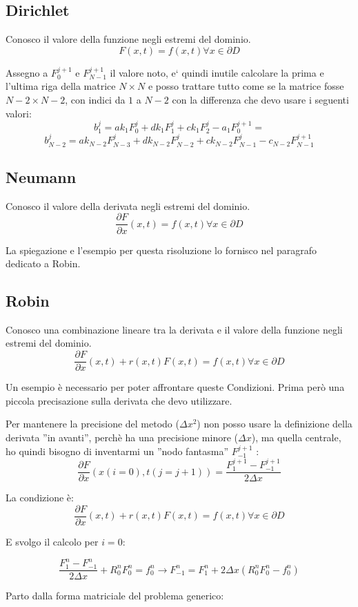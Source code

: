 \documentclass[]{article}
\newcommand{\pde}[2]{\ensuremath{\frac{\partial #1}{\partial #2}}}
\newcommand{\lr}[3]{\ensuremath{\left#1 #3 \right#2}}
\newcommand{\lrt}[1]{\lr{(}{)}{#1}}
\numberwithin{equation}{subsection}
\begin{document}
\subsection{Dirichlet}
Conosco il valore della funzione negli estremi del dominio.
$$F(x,t) = f(x,t) \forall x \in \partial D$$

Assegno a $F_0^{j+1}$ e $F_{N-1}^{j+1}$ il valore noto, e` quindi inutile calcolare la prima e l'ultima riga della matrice $N\times N$ e posso trattare tutto come se la matrice fosse $N-2\times N-2$, con indici da $1$ a $N-2$ con la differenza che devo usare i seguenti valori:
$$b_1^j = ak_1 F_{0}^{j}+ dk_1 F_{1}^{j} + ck_1 F_{2}^{j} - a_1 F_0^{j+1}  = $$
$$b_{N-2}^j = ak_{N-2} F_{N-3}^{j}+ dk_{N-2} F_{N-2}^{j} + ck_{N-2} F_{N-1}^{j} - c_{N-2} F_{N-1}^{j+1} $$
\subsection{Neumann}
Conosco il valore della derivata negli estremi del dominio.
$$\pde Fx(x,t) = f(x,t) \forall x \in \partial D$$

La spiegazione e l'esempio per questa risoluzione lo fornisco nel paragrafo dedicato a Robin.

\subsection{Robin}
Conosco una combinazione lineare tra la derivata e il valore della funzione negli estremi del dominio.
$$\pde Fx(x,t) +r(x,t) F(x,t) = f(x,t) \forall x \in \partial D$$

Un esempio \`e necessario per poter affrontare queste Condizioni. Prima per\`o una piccola precisazione sulla derivata che devo utilizzare.

Per mantenere la precisione del metodo ($\Delta x^2$) non posso usare la definizione della derivata ''in avanti'', perch\`e ha una precisione minore ($\Delta x$), ma quella centrale,  ho quindi bisogno di inventarmi un ''nodo fantasma'' $F_{-1}^{j+1}$ :
$$\pde Fx(x(i=0),t(j=j+1)) = \frac{F_{1}^{j+1}-F_{-1}^{j+1}}{2\Delta x}$$

La condizione \`e:
$$\pde Fx(x,t) +r(x,t) F(x,t) = f(x,t) \forall x \in \partial D$$

E svolgo il calcolo per $i=0$:

$$\frac{F_{1}^{n}-F_{-1}^{n}}{2\Delta x} + R_0^nF_{0}^{n} = f_0^n  \to 
F_{-1}^{n} = F_{1}^{n} + 2\Delta x \lrt{R_0^nF_{0}^{n}-f^n_0}$$

Parto dalla forma matriciale del problema generico:
\end{document}
